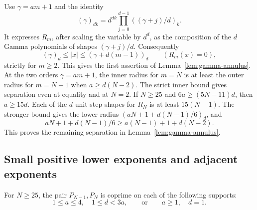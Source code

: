 Use \(\gamma=am+1\) and the identity
\[
 (\gamma)_{dk}=d^{dk}\prod_{j=0}^{d-1}((\gamma+j)/d)_k .
\]
It expresses \(R_m\), after scaling the variable by \(d^d\),
as the composition of the \(d\) Gamma polynomials of shapes
\((\gamma+j)/d\). Consequently
\[
 (\gamma)_d\le |x|\le(\gamma+d(m-1))_d
 \qquad(R_m(x)=0),
\]
strictly for \(m\ge2\). This gives the first assertion of
Lemma~\ref{lem:gamma-annulus}. At the two orders
\(\gamma=am+1\), the inner radius for \(m=N\) is at least
the outer radius for \(m=N-1\) when \(a\ge d(N-2)\).
The strict inner bound gives separation even at equality and
at \(N=2\). If \(N\ge25\) and \(6a\ge(5N-11)d\), then
\(a\ge15d\). Each of the \(d\) unit-step shapes for
\(R_N\) is at least \(15(N-1)\). The stronger bound gives
the lower radius
\((aN+1+d(N-1)/6)_d\), and
\[
 aN+1+d(N-1)/6\ge a(N-1)+1+d(N-2).
\]
This proves the remaining separation in
Lemma~\ref{lem:gamma-annulus}.

\subsection{Small positive lower exponents and adjacent exponents}

\begin{proposition}
\label{prop:additional-boundary}
For \(N\ge25\), the pair \(P_{N-1},P_N\) is coprime on
each of the following supports:
\[
 1\le a\le4,\quad 1\le d<3a,
 \qquad\text{or}\qquad
 a\ge1,\quad d=1.
\]
\end{proposition}

